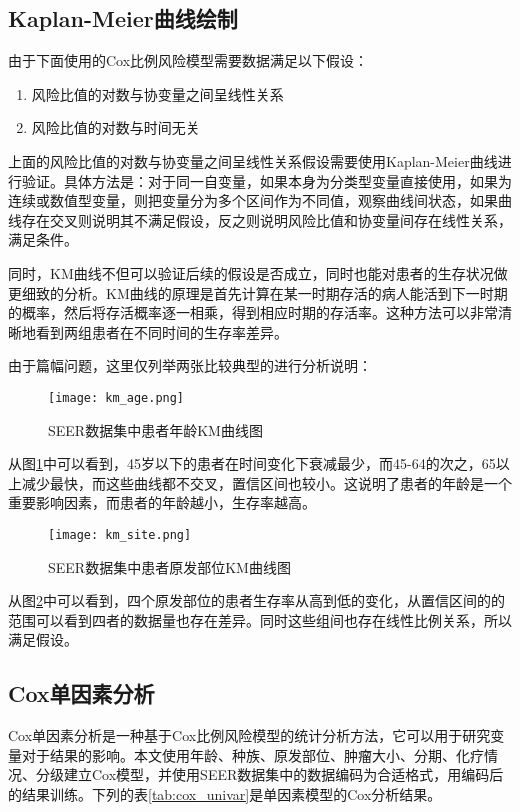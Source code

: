 \subsection{Kaplan-Meier曲线绘制}

由于下面使用的Cox比例风险模型需要数据满足以下假设：
\begin{enumerate}
    \item 风险比值的对数与协变量之间呈线性关系
    \item 风险比值的对数与时间无关
\end{enumerate}

上面的风险比值的对数与协变量之间呈线性关系假设需要使用Kaplan-Meier曲线进行验证。具体方法是：对于同一自变量，如果本身为分类型变量直接使用，如果为连续或数值型变量，则把变量分为多个区间作为不同值，观察曲线间状态，如果曲线存在交叉则说明其不满足假设，反之则说明风险比值和协变量间存在线性关系，满足条件。

同时，KM曲线不但可以验证后续的假设是否成立，同时也能对患者的生存状况做更细致的分析。KM曲线的原理是首先计算在某一时期存活的病人能活到下一时期的概率，然后将存活概率逐一相乘，得到相应时期的存活率。这种方法可以非常清晰地看到两组患者在不同时间的生存率差异。

由于篇幅问题，这里仅列举两张比较典型的进行分析说明：

\begin{figure}[!htbp]
    \centering
    \texttt{[image: km\_age.png]}
    \caption{SEER数据集中患者年龄KM曲线图} \label{fig:km_age}
\end{figure}

从图\ref{fig:km_age}中可以看到，45岁以下的患者在时间变化下衰减最少，而45-64的次之，65以上减少最快，而这些曲线都不交叉，置信区间也较小。这说明了患者的年龄是一个重要影响因素，而患者的年龄越小，生存率越高。

\begin{figure}[!htbp]
    \centering
    \texttt{[image: km\_site.png]}
    \caption{SEER数据集中患者原发部位KM曲线图} \label{fig:km_site}
\end{figure}

从图\ref{fig:km_site}中可以看到，四个原发部位的患者生存率从高到低的变化，从置信区间的的范围可以看到四者的数据量也存在差异。同时这些组间也存在线性比例关系，所以满足假设。

\subsection{Cox单因素分析}

Cox单因素分析是一种基于Cox比例风险模型的统计分析方法，它可以用于研究变量对于结果的影响。本文使用年龄、种族、原发部位、肿瘤大小、分期、化疗情况、分级建立Cox模型，并使用SEER数据集中的数据编码为合适格式，用编码后的结果训练。下列的表\ref{tab:cox_univar}是单因素模型的Cox分析结果。

